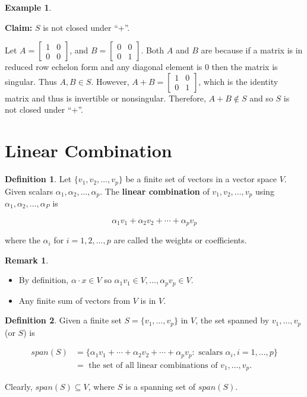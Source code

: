 \documentclass[12pt]{article}
\theoremstyle{definition}
\newtheorem*{definition}{Definition}
\newtheorem*{example}{Example}
\newtheorem*{remark}{Remark}
\begin{document}
\begin{example}
\begin{enumerate}[label = (\arabic*)]
\textbf{Claim:} $S$ is not closed under ``+''. 

Let $A = \begin{bmatrix} 1 & 0 \\ 0 & 0 \end{bmatrix}$, and 
$B = \begin{bmatrix} 0 & 0 \\ 0 & 1 \end{bmatrix}$. Both $A$ and $B$ are because if a matrix
is in reduced row echelon form and any diagonal element is 0 then the matrix is singular. Thus
$A , B \in S$. However, $A + B = \begin{bmatrix} 1 & 0 \\ 0 & 1 \end{bmatrix}$, which is
the identity matrix and thus is invertible or nonsingular. Therefore, $A + B \notin S$ and
so $S$ is not closed under ``+''.

\end{enumerate}
\end{example}

\section{Linear Combination}

\begin{definition}
Let $\{ v_1, v_2, \ldots, v_p \}$ be a finite set of vectors in a vector space $V$. Given 
scalars $\alpha_1, \alpha_2, \ldots, \alpha_p$. The \textbf{linear combination} of
$v_1, v_2, \ldots, v_p$ using $\alpha_1, \alpha_2, \dots, \alpha_P$ is

\[
\alpha_1 v_1 + \alpha_2 v_2 + \cdots + \alpha_p v_p
\]

where the $\alpha_i$ for $i = 1, 2, \ldots, p$ are called the weights or coefficients.
\end{definition}

\begin{remark}
\begin{itemize}
\item By definition, $\alpha \cdot x \in V$ so $\alpha_1 v_1 \in V, \ldots, \alpha_p v_p \in V$.
\item Any finite sum of vectors from $V$ is in $V$.
\end{itemize}
\end{remark}

\begin{definition}
Given a finite set $S = \{v_1, \ldots, v_p \}$ in $V$, the set spanned by $v_1, \ldots, v_p$
(or $S$) is

\begin{align*}
span(S) &= \{ \alpha_1 v_1 + \cdots + \alpha_2 v_2 + \cdots + \alpha_p v_p : \text{ scalars  }
\alpha_i, i = 1, \ldots, p \} \\
&= \text{ the set of all linear combinations of } v_1, \dots, v_p.
\end{align*}

Clearly, $span(S) \subseteq V$, where $S$ is a spanning set of $span(S)$.
\end{definition}
\end{document}
